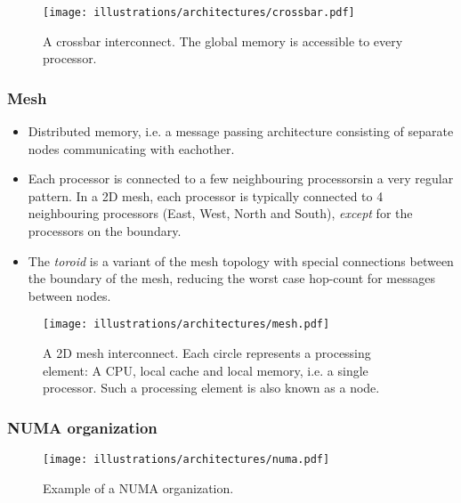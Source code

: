 \begin{figure}[htbp]
  \centering
  \texttt{[image: illustrations/architectures/crossbar.pdf]}
  \caption{A crossbar interconnect. The global memory is accessible to every processor.}
  \label{fig:crossbar}
\end{figure}


\subsubsection{Mesh} %
\label{ssub:mesh}

\begin{itemize}
  \item Distributed memory, i.e. a message passing architecture consisting of separate nodes communicating with eachother.
  \item Each processor is connected to a few neighbouring processorsin a very regular pattern. In a 2D mesh, each processor is typically connected to 4 neighbouring processors (East, West, North and South), \emph{except} for the processors on the boundary.
  \item The \emph{toroid} is a variant of the mesh topology with special connections between the boundary of the mesh, reducing the worst case hop-count for messages between nodes.
\end{itemize}

\begin{figure}[htbp]
  \centering
  \texttt{[image: illustrations/architectures/mesh.pdf]}
  \caption{A 2D mesh interconnect. Each circle represents a processing element: A CPU, local cache and local memory, i.e. a single processor. Such a processing element is also known as a node.}
  \label{fig:mesh}
\end{figure}


\subsubsection{NUMA organization} %
\label{ssub:numa_organization}

\begin{figure}[H]
  \centering
  \texttt{[image: illustrations/architectures/numa.pdf]}
  \caption{Example of a NUMA organization.}
  \label{fig:label}
\end{figure}



